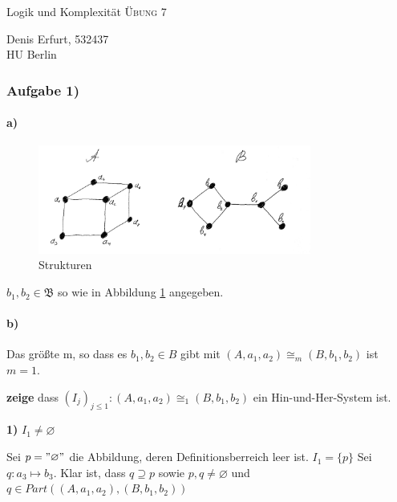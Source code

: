 \documentclass[12pt]{article}
\begin{document}
\begin{center}
\Large
Logik und Komplexität  \textsc{ Übung 7 }
\end{center}

\begin{flushright}
Denis Erfurt, 532437\\
HU Berlin \\

\vspace{2 mm}

\end{flushright}

\subsubsection*{Aufgabe 1)}

\paragraph{a)}

\begin{figure}[h]
 \centering
 \includegraphics[width=0.8\textwidth]{struct.jpg}
 \caption{Strukturen}
 \label{struct}
\end{figure}

$b_1,b_2\in \mathfrak{B}$ so wie in Abbildung \ref{struct} angegeben.

\paragraph{b)}
Das größte m, so dass es $b_1, b_2\in B$ gibt mit $(A,a_1,a_2) \cong_m (B,b_1,b_2)$ ist $m=1$.

\textbf{zeige} dass $(I_j)_{j\leq 1}:(A,a_1,a_2) \cong_1 (B,b_1,b_2)$ ein Hin-und-Her-System ist.

\textbf{1)} $I_1 \neq \varnothing$

Sei $p = "\varnothing"$ die Abbildung, deren Definitionsberreich leer ist. $ I_1 = \{ p \}$
Sei $q: a_3 \mapsto b_3$. Klar ist, dass $q\supseteq p$
sowie $p,q\neq \varnothing$ und $q\in Part((A,a_1,a_2), (B,b_1,b_2))$
\end{document}
